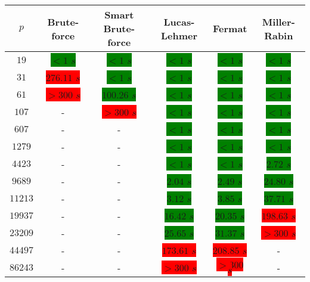 \documentclass[main.tex]{subfiles}
\begin{document}
\begin{table}[ht!]
  \begin{tabular}{||c | c c c c c||}
    \hline
    $p$ & Brute-force & Smart Brute-force & Lucas-Lehmer & Fermat & Miller-Rabin  \\ [0.5ex] 
    \hline\hline
    $19$ & \colorbox{green}{$<1$ $s$} & \colorbox{green}{$<1$ $s$} & \colorbox{green}{$<1$ $s$} & \colorbox{green}{$<1$ $s$} & \colorbox{green}{$<1$ $s$}\\
    $31$ & \colorbox{red}{$276.11$ $s$} & \colorbox{green}{$<1$ $s$} & \colorbox{green}{$<1$ $s$} & \colorbox{green}{$<1$ $s$} & \colorbox{green}{$<1$ $s$}\\
    $61$ & \colorbox{red}{$>300$ $s$} & \colorbox{green}{$100.26$ $s$} & \colorbox{green}{$<1$ $s$} & \colorbox{green}{$<1$ $s$} & \colorbox{green}{$<1$ $s$}\\
    $107$ & - & \colorbox{red}{$>300$ $s$} & \colorbox{green}{$<1$ $s$} & \colorbox{green}{$<1$ $s$} & \colorbox{green}{$<1$ $s$}\\
    $607$ & - & - & \colorbox{green}{$<1$ $s$} & \colorbox{green}{$<1$ $s$} & \colorbox{green}{$<1$ $s$}\\
    $1279$ & - & - & \colorbox{green}{$<1$ $s$} & \colorbox{green}{$<1$ $s$} & \colorbox{green}{$<1$ $s$}\\
    $4423$ & - & - & \colorbox{green}{$<1$ $s$} & \colorbox{green}{$<1$ $s$} & \colorbox{green}{$2.72$ $s$}\\
    $9689$ & - & - & \colorbox{green}{$2.04$ $s$} & \colorbox{green}{$2.49$ $s$} & \colorbox{green}{$24.80$ $s$}\\
    $11213$ & - & - & \colorbox{green}{$3.12$ $s$} & \colorbox{green}{$3.85$ $s$} & \colorbox{green}{$37.71$ $s$}\\
    $19937$ & - & - & \colorbox{green}{$16.42$ $s$} & \colorbox{green}{$20.35$ $s$} &  \colorbox{red}{$198.63$ $s$}\\
    $23209$ & - & - & \colorbox{green}{$25.65$ $s$} & \colorbox{green}{$31.37$ $s$} & \colorbox{red}{$>300$ $s$}\\ 
    $44497$ & - & - & \colorbox{red}{$173.61$ $s$} &  \colorbox{red}{$208.85$ $s$} & -\\ 
    $86243$ & - & - & \colorbox{red}{$>300$ $s$} & \colorbox{red}{$>300$ $s$} & -\\  [1ex] 
    \hline
  \end{tabular}
\end{table}
\end{document}
